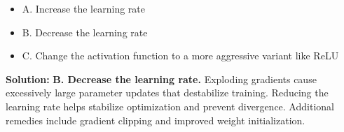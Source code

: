 \documentclass{article}
\begin{document}
\begin{enumerate}
\begin{itemize}
    \item A. Increase the learning rate
    \item B. Decrease the learning rate
    \item C. Change the activation function to a more aggressive variant like ReLU
\end{itemize}

\textbf{Solution:}  
\textbf{B. Decrease the learning rate.}  
Exploding gradients cause excessively large parameter updates that destabilize training. Reducing the learning rate helps stabilize optimization and prevent divergence. Additional remedies include gradient clipping and improved weight initialization.

\end{enumerate}


\end{document}
